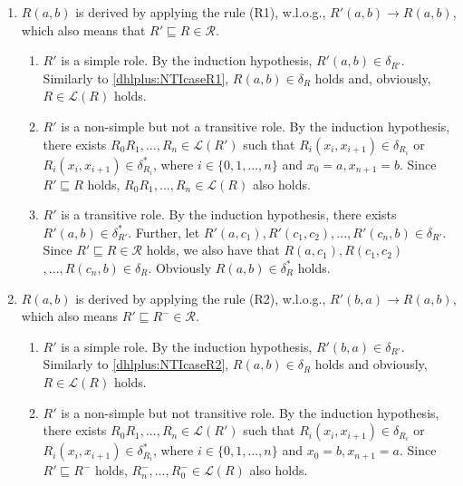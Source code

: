 \begin{enumerate}[leftmargin=12ex,label=Case~2.\arabic*, ref=Case~2.\arabic*]
\item $R(a,b)$ is derived by applying the rule (R1), w.l.o.g., $R'(a,b)\rightarrow R(a,b)$,
    which also means that $R'\sqsubseteq R\in\mathcal{R}$.

    \begin{enumerate}[leftmargin=8ex,label=Case~2.1.\arabic*]
    \item $R'$ is a simple role. By the induction hypothesis, $R'(a,b)\in\delta_{R'}$.
        Similarly to \ref{dhlplus:NTIcaseR1}, $R(a,b)\in\delta_{R}$ holds and,
        obviously, $R\in\mathcal{L}(R)$ holds.

    \item $R'$ is a non-simple but not a transitive role.
        By the induction hypothesis, there exists $R_0R_1,...,R_n\in\mathcal{L}(R')$
        such that $R_i(x_i,x_{i+1})\in\delta_{R_i}$ or $R_i(x_i,x_{i+1})\in\delta^*_{R_i}$, where $i\in\{0,1,...,n\}$
        and $x_0=a, x_{n+1}=b$. Since $R'\sqsubseteq R$ holds, $R_0R_1,...,R_n\in\mathcal{L}(R)$ also holds.

    \item $R'$ is a transitive role.
        By the induction hypothesis, there exists $R'(a,b)\in\delta^*_{R'}$.
        Further, let $R'(a,c_1),R'(c_1,c_2),...,R'(c_n,b)\in\delta_{R'}$.
        Since $R'\sqsubseteq R\in\mathcal{R}$ holds, we also have that
        $R(a,c_1),R(c_1,c_2)$ $,...,R(c_n,b)\in\delta_{R}$. Obviously $R(a,b)\in\delta^*_{R}$ holds.
    \end{enumerate}

\item $R(a,b)$ is derived by applying the rule (R2), w.l.o.g., $R'(b,a)\rightarrow R(a,b)$,
    which also means $R'\sqsubseteq R^-\in\mathcal{R}$.

    \begin{enumerate}[leftmargin=8ex,label=Case~2.2.\arabic*]
    \item $R'$ is a simple role. By the induction hypothesis, $R'(b,a)\in\delta_{R'}$.
        Similarly to \ref{dhlplus:NTIcaseR2}, $R(a,b)\in\delta_{R}$ holds and
        obviously, $R\in\mathcal{L}(R)$ holds.

    \item $R'$ is a non-simple but not transitive role. By the induction hypothesis, there exists $R_0R_1,...,R_n\in\mathcal{L}(R')$
        such that $R_i(x_i,x_{i+1})\in\delta_{R_i}$ or $R_i(x_i,x_{i+1})\in\delta^*_{R_i}$, where $i\in\{0,1,...,n\}$
        and $x_0=b, x_{n+1}=a$. Since $R'\sqsubseteq R^-$ holds, $R_n^-,...,R_0^-\in\mathcal{L}(R)$ also holds.


\end{enumerate}
\end{enumerate}
